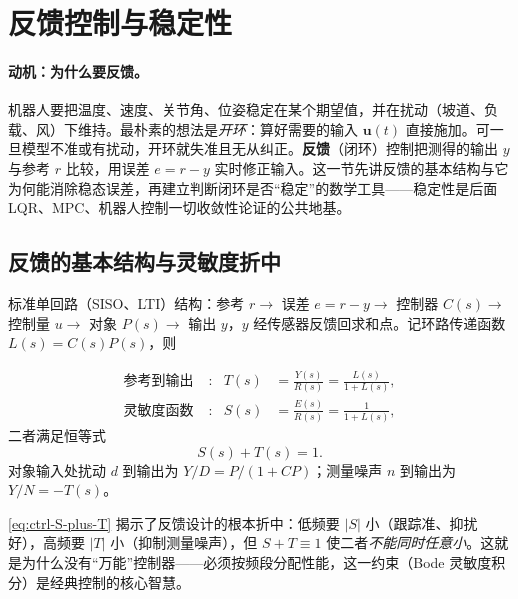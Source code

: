 \section{反馈控制与稳定性}
\label{sec:ctrl-feedback}

\paragraph{动机：为什么要反馈。}
机器人要把温度、速度、关节角、位姿稳定在某个期望值，并在扰动（坡道、负载、风）下维持。最朴素的想法是\emph{开环}：算好需要的输入 $\mathbf{u}(t)$ 直接施加。可一旦模型不准或有扰动，开环就失准且无从纠正。\textbf{反馈}（闭环）控制把测得的输出 $y$ 与参考 $r$ 比较，用误差 $e=r-y$ 实时修正输入。这一节先讲反馈的基本结构与它为何能消除稳态误差，再建立判断闭环是否“稳定”的数学工具——稳定性是后面 LQR、MPC、机器人控制一切收敛性论证的公共地基。

\subsection{反馈的基本结构与灵敏度折中}
\label{sec:ctrl-feedback-struct}

标准单回路（SISO、LTI）结构：参考 $r\to$ 误差 $e=r-y\to$ 控制器 $C(s)\to$ 控制量 $u\to$ 对象 $P(s)\to$ 输出 $y$，$y$ 经传感器反馈回求和点\cite{astrom2008feedback}。记环路传递函数 $L(s)=C(s)P(s)$，则

\begin{align}
  \text{参考到输出}\;&: & T(s)&=\frac{Y(s)}{R(s)}=\frac{L(s)}{1+L(s)},\label{eq:ctrl-comp-sens}\\
  \text{灵敏度函数}\;&: & S(s)&=\frac{E(s)}{R(s)}=\frac{1}{1+L(s)},\label{eq:ctrl-sens}
\end{align}
二者满足恒等式
\begin{equation}
  S(s)+T(s)=1.
  \label{eq:ctrl-S-plus-T}
\end{equation}
对象输入处扰动 $d$ 到输出为 $Y/D=P/(1+CP)$；测量噪声 $n$ 到输出为 $Y/N=-T(s)$。

\begin{insight}
\cref{eq:ctrl-S-plus-T} 揭示了反馈设计的根本折中：低频要 $|S|$ 小（跟踪准、抑扰好），高频要 $|T|$ 小（抑制测量噪声），但 $S+T\equiv1$ 使二者\emph{不能同时任意小}。这就是为什么没有“万能”控制器——必须按频段分配性能，这一约束（Bode 灵敏度积分）是经典控制的核心智慧。
\end{insight}

